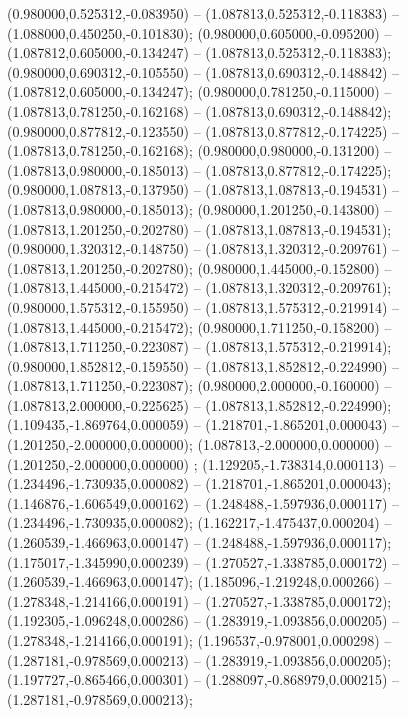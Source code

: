  (0.980000,0.525312,-0.083950) -- (1.087813,0.525312,-0.118383) -- (1.088000,0.450250,-0.101830);
 (0.980000,0.605000,-0.095200) -- (1.087812,0.605000,-0.134247) -- (1.087813,0.525312,-0.118383);
 (0.980000,0.690312,-0.105550) -- (1.087813,0.690312,-0.148842) -- (1.087812,0.605000,-0.134247);
 (0.980000,0.781250,-0.115000) -- (1.087813,0.781250,-0.162168) -- (1.087813,0.690312,-0.148842);
 (0.980000,0.877812,-0.123550) -- (1.087813,0.877812,-0.174225) -- (1.087813,0.781250,-0.162168);
 (0.980000,0.980000,-0.131200) -- (1.087813,0.980000,-0.185013) -- (1.087813,0.877812,-0.174225);
 (0.980000,1.087813,-0.137950) -- (1.087813,1.087813,-0.194531) -- (1.087813,0.980000,-0.185013);
 (0.980000,1.201250,-0.143800) -- (1.087813,1.201250,-0.202780) -- (1.087813,1.087813,-0.194531);
 (0.980000,1.320312,-0.148750) -- (1.087813,1.320312,-0.209761) -- (1.087813,1.201250,-0.202780);
 (0.980000,1.445000,-0.152800) -- (1.087813,1.445000,-0.215472) -- (1.087813,1.320312,-0.209761);
 (0.980000,1.575312,-0.155950) -- (1.087813,1.575312,-0.219914) -- (1.087813,1.445000,-0.215472);
 (0.980000,1.711250,-0.158200) -- (1.087813,1.711250,-0.223087) -- (1.087813,1.575312,-0.219914);
 (0.980000,1.852812,-0.159550) -- (1.087813,1.852812,-0.224990) -- (1.087813,1.711250,-0.223087);
 (0.980000,2.000000,-0.160000) -- (1.087813,2.000000,-0.225625) -- (1.087813,1.852812,-0.224990);
 (1.109435,-1.869764,0.000059) -- (1.218701,-1.865201,0.000043) -- (1.201250,-2.000000,0.000000);
 (1.087813,-2.000000,0.000000) -- (1.201250,-2.000000,0.000000) ;
 (1.129205,-1.738314,0.000113) -- (1.234496,-1.730935,0.000082) -- (1.218701,-1.865201,0.000043);
 (1.146876,-1.606549,0.000162) -- (1.248488,-1.597936,0.000117) -- (1.234496,-1.730935,0.000082);
 (1.162217,-1.475437,0.000204) -- (1.260539,-1.466963,0.000147) -- (1.248488,-1.597936,0.000117);
 (1.175017,-1.345990,0.000239) -- (1.270527,-1.338785,0.000172) -- (1.260539,-1.466963,0.000147);
 (1.185096,-1.219248,0.000266) -- (1.278348,-1.214166,0.000191) -- (1.270527,-1.338785,0.000172);
 (1.192305,-1.096248,0.000286) -- (1.283919,-1.093856,0.000205) -- (1.278348,-1.214166,0.000191);
 (1.196537,-0.978001,0.000298) -- (1.287181,-0.978569,0.000213) -- (1.283919,-1.093856,0.000205);
 (1.197727,-0.865466,0.000301) -- (1.288097,-0.868979,0.000215) -- (1.287181,-0.978569,0.000213);
